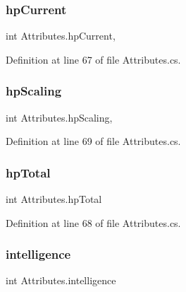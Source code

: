 \subsubsection{\texorpdfstring{hpCurrent}{hpCurrent}}
{\footnotesize\ttfamily int Attributes.\+hp\+Current\hspace{0.3cm}{\ttfamily [get]}, {\ttfamily [set]}}



Definition at line 67 of file Attributes.\+cs.

\mbox{\label{class_attributes_a446ba39447eafcd8d839e97d7c890fb6}} 
\subsubsection{\texorpdfstring{hpScaling}{hpScaling}}
{\footnotesize\ttfamily int Attributes.\+hp\+Scaling\hspace{0.3cm}{\ttfamily [get]}, {\ttfamily [set]}}



Definition at line 69 of file Attributes.\+cs.

\mbox{\label{class_attributes_a61de3d3141922807c7c77fc86819b934}} 
\subsubsection{\texorpdfstring{hpTotal}{hpTotal}}
{\footnotesize\ttfamily int Attributes.\+hp\+Total\hspace{0.3cm}{\ttfamily [get]}}



Definition at line 68 of file Attributes.\+cs.

\mbox{\label{class_attributes_a39014acfca0b4d854c675663a05b067e}} 
\subsubsection{\texorpdfstring{intelligence}{intelligence}}
{\footnotesize\ttfamily int Attributes.\+intelligence\hspace{0.3cm}{\ttfamily [get]}}



